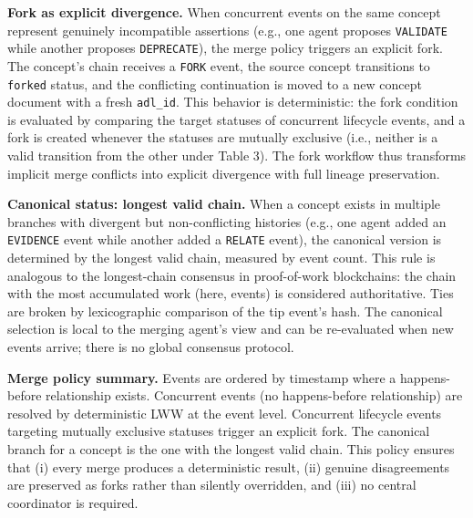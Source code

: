 \textbf{Fork as explicit divergence.} When concurrent events on the same concept represent genuinely incompatible assertions (e.g., one agent proposes \texttt{VALIDATE} while another proposes \texttt{DEPRECATE}), the merge policy triggers an explicit fork. The concept's chain receives a \texttt{FORK} event, the source concept transitions to \texttt{forked} status, and the conflicting continuation is moved to a new concept document with a fresh \texttt{adl\_id}. This behavior is deterministic: the fork condition is evaluated by comparing the target statuses of concurrent lifecycle events, and a fork is created whenever the statuses are mutually exclusive (i.e., neither is a valid transition from the other under Table 3). The fork workflow thus transforms implicit merge conflicts into explicit divergence with full lineage preservation.

\textbf{Canonical status: longest valid chain.} When a concept exists in multiple branches with divergent but non-conflicting histories (e.g., one agent added an \texttt{EVIDENCE} event while another added a \texttt{RELATE} event), the canonical version is determined by the longest valid chain, measured by event count. This rule is analogous to the longest-chain consensus in proof-of-work blockchains: the chain with the most accumulated work (here, events) is considered authoritative. Ties are broken by lexicographic comparison of the tip event's hash. The canonical selection is local to the merging agent's view and can be re-evaluated when new events arrive; there is no global consensus protocol.

\textbf{Merge policy summary.} Events are ordered by timestamp where a happens-before relationship exists. Concurrent events (no happens-before relationship) are resolved by deterministic LWW at the event level. Concurrent lifecycle events targeting mutually exclusive statuses trigger an explicit fork. The canonical branch for a concept is the one with the longest valid chain. This policy ensures that (i) every merge produces a deterministic result, (ii) genuine disagreements are preserved as forks rather than silently overridden, and (iii) no central coordinator is required.

